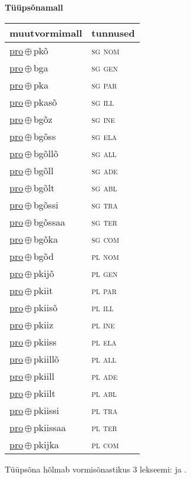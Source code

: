 

\vspace{3.5em}
\noindent \begin{minipage}{\textwidth}
\noindent \textbf{Tüüpsõnamall \,}\\

\begin{sideways}
\begin{tabular}{l l}
muutvormimall & tunnused \\
\hline
\underline{pro}\,$\oplus$\,pkõ & \textsc{ sg nom } \\
\underline{pro}\,$\oplus$\,bga & \textsc{ sg gen } \\
\underline{pro}\,$\oplus$\,pka & \textsc{ sg par } \\
\underline{pro}\,$\oplus$\,pkasõ & \textsc{ sg ill } \\
\underline{pro}\,$\oplus$\,bgõz & \textsc{ sg ine } \\
\underline{pro}\,$\oplus$\,bgõss & \textsc{ sg ela } \\
\underline{pro}\,$\oplus$\,bgõllõ & \textsc{ sg all } \\
\underline{pro}\,$\oplus$\,bgõll & \textsc{ sg ade } \\
\underline{pro}\,$\oplus$\,bgõlt & \textsc{ sg abl } \\
\underline{pro}\,$\oplus$\,bgõssi & \textsc{ sg tra } \\
\underline{pro}\,$\oplus$\,bgõssaa & \textsc{ sg ter } \\
\underline{pro}\,$\oplus$\,bgõka & \textsc{ sg com } \\
\underline{pro}\,$\oplus$\,bgõd & \textsc{ pl nom } \\
\underline{pro}\,$\oplus$\,pkijõ & \textsc{ pl gen } \\
\underline{pro}\,$\oplus$\,pkiit & \textsc{ pl par } \\
\underline{pro}\,$\oplus$\,pkiisõ & \textsc{ pl ill } \\
\underline{pro}\,$\oplus$\,pkiiz & \textsc{ pl ine } \\
\underline{pro}\,$\oplus$\,pkiiss & \textsc{ pl ela } \\
\underline{pro}\,$\oplus$\,pkiillõ & \textsc{ pl all } \\
\underline{pro}\,$\oplus$\,pkiill & \textsc{ pl ade } \\
\underline{pro}\,$\oplus$\,pkiilt & \textsc{ pl abl } \\
\underline{pro}\,$\oplus$\,pkiissi & \textsc{ pl tra } \\
\underline{pro}\,$\oplus$\,pkiissaa & \textsc{ pl ter } \\
\underline{pro}\,$\oplus$\,pkijka & \textsc{ pl com } \\
\end{tabular}
\end{sideways}
\label{tab:tüüpsõnamall-propkõ}

\end{minipage}

 
\vspace{1em}
\noindent Tüüpsõna hõlmab vormisõnastikus 3 lekseemi:  ja .

